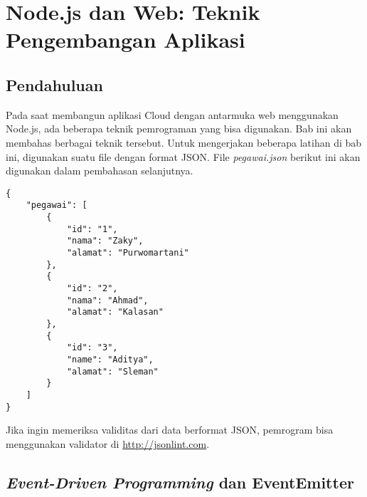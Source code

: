 \chapter{Node.js dan Web: Teknik Pengembangan Aplikasi}

\section{Pendahuluan}

Pada saat membangun aplikasi Cloud dengan antarmuka web menggunakan Node.js, ada beberapa teknik pemrograman yang bisa digunakan. Bab ini akan membahas berbagai teknik tersebut. Untuk mengerjakan beberapa latihan di bab ini, digunakan suatu file dengan format JSON. File \textit{pegawai.json} berikut ini akan digunakan dalam pembahasan selanjutnya.

\lstset{language=JavaScript,caption=pegawai.json}
\begin{lstlisting}
{
    "pegawai": [
        {
            "id": "1",
            "nama": "Zaky",
            "alamat": "Purwomartani"
        },
        {
            "id": "2",
            "nama": "Ahmad",
            "alamat": "Kalasan"
        },
        {
            "id": "3",
            "name": "Aditya",
            "alamat": "Sleman"
        }
    ]
}
\end{lstlisting}

Jika ingin memeriksa validitas dari data berformat JSON, pemrogram bisa menggunakan validator di \url{http://jsonlint.com}.

\section{\textit{Event-Driven Programming} dan EventEmitter}


